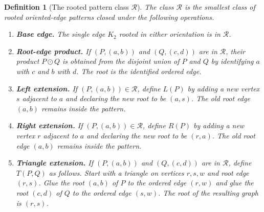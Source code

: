 \documentclass[11pt]{article}
\newtheorem{definition}[theorem]{Definition}
\newcommand{\cR}{\mathcal{R}}
\begin{document}
\begin{definition}[The rooted pattern class $\cR$]
The class $\cR$ is the smallest class of rooted oriented-edge patterns closed under the following operations.

\begin{enumerate}[label=\textup{(\Alph*)},leftmargin=2.4em]
\item \textbf{Base edge.}  The single edge $K_2$ rooted in either orientation is in $\cR$.

\item \textbf{Root-edge product.}  If $(P,(a,b))$ and $(Q,(c,d))$ are in $\cR$, their product $P\odot Q$ is obtained from the disjoint union of $P$ and $Q$ by identifying $a$ with $c$ and $b$ with $d$.  The root is the identified ordered edge.

\item \textbf{Left extension.}  If $(P,(a,b))\in\cR$, define $L(P)$ by adding a new vertex $s$ adjacent to $a$ and declaring the new root to be $(a,s)$.  The old root edge $(a,b)$ remains inside the pattern.

\item \textbf{Right extension.}  If $(P,(a,b))\in\cR$, define $R(P)$ by adding a new vertex $r$ adjacent to $a$ and declaring the new root to be $(r,a)$.  The old root edge $(a,b)$ remains inside the pattern.

\item \textbf{Triangle extension.}  If $(P,(a,b))$ and $(Q,(c,d))$ are in $\cR$, define $T(P,Q)$ as follows.  Start with a triangle on vertices $r,s,w$ and root edge $(r,s)$.  Glue the root $(a,b)$ of $P$ to the ordered edge $(r,w)$ and glue the root $(c,d)$ of $Q$ to the ordered edge $(s,w)$.  The root of the resulting graph is $(r,s)$.
\end{enumerate}
\end{definition}
\end{document}
